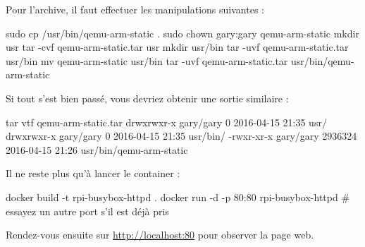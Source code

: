 \documentclass[11pt,a4paper,oneside]{report}
\begin{document}
Pour l'archive, il faut effectuer les manipulations suivantes :

\begin{bashcode}
sudo cp /usr/bin/qemu-arm-static .
sudo chown gary:gary qemu-arm-static
mkdir usr
tar -cvf qemu-arm-static.tar usr
mkdir usr/bin
tar -uvf qemu-arm-static.tar usr/bin
mv qemu-arm-static usr/bin
tar -uvf qemu-arm-static.tar usr/bin/qemu-arm-static
\end{bashcode}

Si tout s'est bien passé, vous devriez obtenir une sortie similaire :

\begin{bashcode}
tar vtf qemu-arm-static.tar
drwxrwxr-x gary/gary         0 2016-04-15 21:35 usr/
drwxrwxr-x gary/gary         0 2016-04-15 21:35 usr/bin/
-rwxr-xr-x gary/gary   2936324 2016-04-15 21:26 usr/bin/qemu-arm-static
\end{bashcode}

Il ne reste plus qu'à lancer le container :

\begin{bashcode}
docker build -t rpi-busybox-httpd .
docker run -d -p 80:80 rpi-busybox-httpd # essayez un autre port s'il est déjà pris
\end{bashcode}

Rendez-vous ensuite sur \url{http://localhost:80} pour observer la page web.
\end{document}
